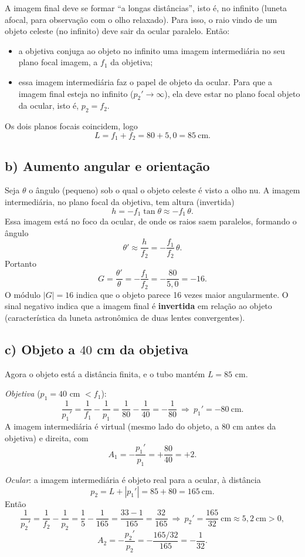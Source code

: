 \documentclass{article}%
\begin{document}
A imagem final deve se formar ``a longas distâncias'', isto é, no infinito (luneta afocal, para observação com o olho relaxado). Para isso, o raio vindo de um objeto celeste (no infinito) deve sair da ocular paralelo. Então:
\begin{itemize}
\item a objetiva conjuga ao objeto no infinito uma imagem intermediária no seu plano focal imagem, a $f_1$ da objetiva;
\item essa imagem intermediária faz o papel de objeto da ocular. Para que a imagem final esteja no infinito ($p_2'\to\infty$), ela deve estar no plano focal objeto da ocular, isto é, $p_2=f_2$.
\end{itemize}
Os dois planos focais coincidem, logo
\[
L=f_1+f_2=80+5{,}0=85\ \mathrm{cm}.
\]

\subsection*{b) Aumento angular e orientação}

Seja $\theta$ o ângulo (pequeno) sob o qual o objeto celeste é visto a olho nu. A imagem intermediária, no plano focal da objetiva, tem altura (invertida)
\[
h=-f_1\tan\theta\approx -f_1\,\theta .
\]
Essa imagem está no foco da ocular, de onde os raios saem paralelos, formando o ângulo
\[
\theta'\approx\frac{h}{f_2}=-\frac{f_1}{f_2}\,\theta .
\]
Portanto
\[
G=\frac{\theta'}{\theta}=-\frac{f_1}{f_2}=-\frac{80}{5{,}0}=-16 .
\]
O módulo $|G|=16$ indica que o objeto parece 16 vezes maior angularmente. O sinal negativo indica que a imagem final é \textbf{invertida} em relação ao objeto (característica da luneta astronômica de duas lentes convergentes).

\subsection*{c) Objeto a $40$ cm da objetiva}

Agora o objeto está a distância finita, e o tubo mantém $L=85$ cm.

\emph{Objetiva} ($p_1=40$ cm $<f_1$):
\[
\frac1{p_1'}=\frac1{f_1}-\frac1{p_1}=\frac1{80}-\frac1{40}=-\frac1{80}\ \Rightarrow\ p_1'=-80\ \mathrm{cm}.
\]
A imagem intermediária é virtual (mesmo lado do objeto, a $80$ cm antes da objetiva) e direita, com
\[
A_1=-\frac{p_1'}{p_1}=+\frac{80}{40}=+2 .
\]

\emph{Ocular}: a imagem intermediária é objeto real para a ocular, à distância
\[
p_2=L+|p_1'|=85+80=165\ \mathrm{cm}.
\]
Então
\[
\frac1{p_2'}=\frac1{f_2}-\frac1{p_2}=\frac1{5}-\frac1{165}=\frac{33-1}{165}=\frac{32}{165}
\ \Rightarrow\ p_2'=\frac{165}{32}\ \mathrm{cm}\approx 5{,}2\ \mathrm{cm}>0,
\]
\[
A_2=-\frac{p_2'}{p_2}=-\frac{165/32}{165}=-\frac1{32}.
\]
\end{document}
